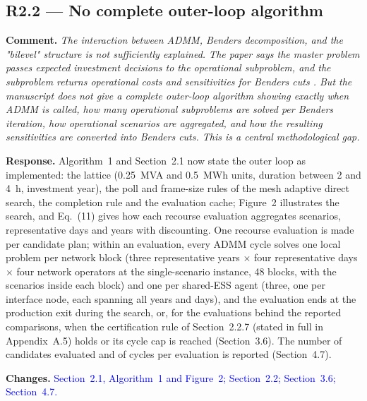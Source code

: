 \documentclass[11pt]{article}
\newcommand{\rcomment}[1]{\par\medskip\noindent\textbf{Comment.} \textit{#1}\par\smallskip}
\newcommand{\rresponse}[1]{\noindent\textbf{Response.} #1\par\smallskip}
\newcommand{\rchanges}[1]{\noindent\textbf{Changes.} \textcolor{blue}{#1}\par\medskip}
\begin{document}
\subsection*{R2.2 --- No complete outer-loop algorithm}
\rcomment{The interaction between ADMM, Benders decomposition, and the "bilevel" structure is not sufficiently explained. The paper says the master problem passes expected investment decisions to the operational subproblem, and the subproblem returns operational costs and sensitivities for Benders cuts . But the manuscript does not give a complete outer-loop algorithm showing exactly when ADMM is called, how many operational subproblems are solved per Benders iteration, how operational scenarios are aggregated, and how the resulting sensitivities are converted into Benders cuts. This is a central methodological gap.}
\rresponse{Algorithm~1 and Section~2.1 now state the outer loop as implemented: the lattice (0.25~MVA and 0.5~MWh units, duration between 2 and 4~h, investment year), the poll and frame-size rules of the mesh adaptive direct search, the completion rule and the evaluation cache; Figure~2 illustrates the search, and Eq.~(11) gives how each recourse evaluation aggregates scenarios, representative days and years with discounting. One recourse evaluation is made per candidate plan; within an evaluation, every ADMM cycle solves one local problem per network block (three representative years $\times$ four representative days $\times$ four network operators at the single-scenario instance, 48 blocks, with the scenarios inside each block) and one per shared-ESS agent (three, one per interface node, each spanning all years and days), and the evaluation ends at the production exit during the search, or, for the evaluations behind the reported comparisons, when the certification rule of Section~2.2.7 (stated in full in Appendix~A.5) holds or its cycle cap is reached (Section~3.6). The number of candidates evaluated and of cycles per evaluation is reported (Section~4.7).}
\rchanges{Section~2.1, Algorithm~1 and Figure~2; Section~2.2; Section~3.6; Section~4.7.}
\end{document}
